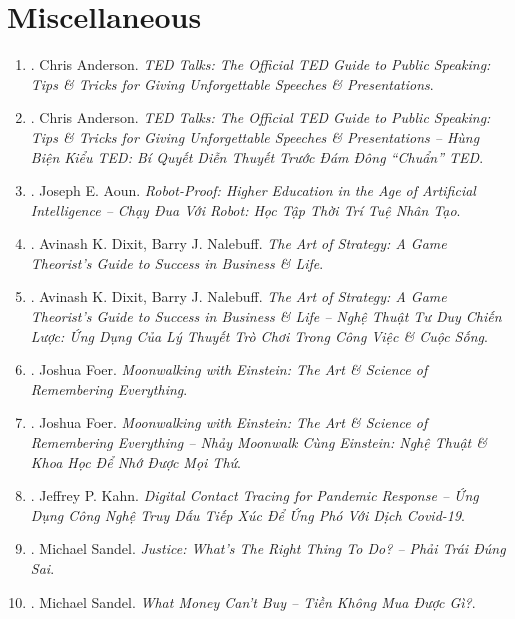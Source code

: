 \documentclass{article}
\begin{document}

\section{Miscellaneous}

\begin{enumerate}
	\item \cite{Anderson2016}. Chris Anderson. {\it TED Talks: The Official TED Guide to Public Speaking: Tips \& Tricks for Giving Unforgettable Speeches \& Presentations}.\hfill{\sf[reading]}
	\item \cite{Anderson2022}. Chris Anderson. {\it TED Talks: The Official TED Guide to Public Speaking: Tips \& Tricks for Giving Unforgettable Speeches \& Presentations -- Hùng Biện Kiểu TED: Bí Quyết Diễn Thuyết Trước Đám Đông ``Chuẩn'' TED}.\hfill{\sf[done]}
	\item \cite{Aoun2019}. Joseph E. Aoun. {\it Robot-Proof: Higher Education in the Age of Artificial Intelligence -- Chạy Đua Với Robot: Học Tập Thời Trí Tuệ Nhân Tạo}.\hfill{\sf[done]}
	\item \cite{Dixit_Nalebuff2010}. Avinash K. Dixit, Barry J. Nalebuff. {\it The Art of Strategy: A Game Theorist's Guide to Success in Business \& Life}.
	\item \cite{Dixit_Nalebuff_strategy}. Avinash K. Dixit, Barry J. Nalebuff. {\it The Art of Strategy: A Game Theorist's Guide to Success in Business \& Life -- Nghệ Thuật Tư Duy Chiến Lược: Ứng Dụng Của Lý Thuyết Trò Chơi Trong Công Việc \& Cuộc Sống}.\hfill{\sf[done]}
	\item \cite{Foer2012}. Joshua Foer. {\it Moonwalking with Einstein: The Art \& Science of Remembering Everything}.\hfill{\sf[reading]}
	\item \cite{Foer_remember}. Joshua Foer. {\it Moonwalking with Einstein: The Art \& Science of Remembering Everything -- Nhảy Moonwalk Cùng Einstein: Nghệ Thuật \& Khoa Học Để Nhớ Được Mọi Thứ}.\hfill{\sf[done]}
	\item \cite{Kahn2020}. Jeffrey P. Kahn. {\it Digital Contact Tracing for Pandemic Response -- Ứng Dụng Công Nghệ Truy Dấu Tiếp Xúc Để Ứng Phó Với Dịch Covid-19}.\hfill{\sf[done]}
	\item \cite{Sandel_justice}. Michael Sandel. {\it Justice: What's The Right Thing To Do? -- Phải Trái Đúng Sai}.\hfill{\sf[done]}
	\item \cite{Sandel_money}. Michael Sandel. {\it What Money Can't Buy -- Tiền Không Mua Được Gì?}.\hfill{\sf[done]}

\end{enumerate}
\end{document}
